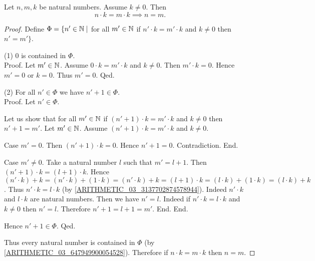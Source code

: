 \documentclass[10pt]{article}
\begin{document}
  \begin{forthel}
    \begin{proposition}
      Let $n, m, k$ be natural numbers.
      Assume $k \neq 0$.
      Then \[ n \cdot k = m \cdot k \implies n = m. \]
    \end{proposition}
    \begin{proof}
      Define $\Phi = \{ n' \in \mathbb{N} \mid$ for all $m' \in \mathbb{N}$ if
      $n' \cdot k = m' \cdot k$ and $k \neq 0$ then $n' = m' \}$.

      (1) $0$ is contained in $\Phi$. \\
      Proof.
        Let $m' \in \mathbb{N}$.
        Assume $0 \cdot k = m' \cdot k$ and $k \neq 0$.
        Then $m' \cdot k = 0$.
        Hence $m' = 0$ or $k = 0$.
        Thus $m' = 0$.
      Qed.

      (2) For all $n' \in \Phi$ we have $n' + 1 \in \Phi$. \\
      Proof.
        Let $n' \in \Phi$.

        Let us show that for all $m' \in \mathbb{N}$ if $(n' + 1) \cdot k =
        m' \cdot k$ and $k \neq 0$ then $n' + 1 = m'$.
          Let $m' \in \mathbb{N}$.
          Assume $(n' + 1) \cdot k = m' \cdot k$ and $k \neq 0$.

          Case $m' = 0$.
            Then $(n' + 1) \cdot k = 0$.
            Hence $n' + 1 = 0$.
            Contradiction.
          End.

          Case $m' \neq 0$.
            Take a natural number $l$ such that $m' = l + 1$.
            Then $(n' + 1) \cdot k = (l + 1) \cdot k$.
            Hence $(n' \cdot k) + k
              = (n' \cdot k) + (1 \cdot k)
              = (n' \cdot k) + k
              = (l + 1) \cdot k
              = (l \cdot k) + (1 \cdot k)
              = (l \cdot k) + k$.
            Thus $n' \cdot k = l \cdot k$ (by \cref{ARITHMETIC_03_3137702874578944}).
            Indeed $n' \cdot k$ and $l \cdot k$ are natural numbers.
            Then we have $n' = l$.
            Indeed if $n' \cdot k = l \cdot k$ and $k \neq 0$ then $n' = l$.
            Therefore $n' + 1 = l + 1 = m'$.
          End.
        End.

        Hence $n' + 1 \in \Phi$.
      Qed.

      Thus every natural number is contained in $\Phi$ (by \cref{ARITHMETIC_03_647949900054528}).
      Therefore if $n \cdot k = m \cdot k$ then $n = m$.
    \end{proof}
  \end{forthel}
\end{document}
